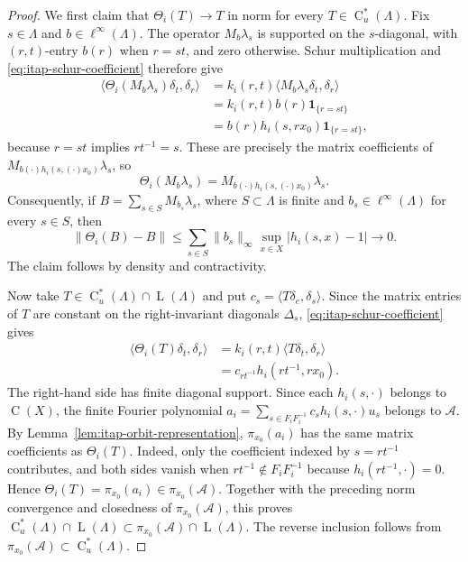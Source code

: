 \documentclass[11pt]{amsart}
\numberwithin{equation}{section}
\newcommand{\rL}{\operatorname{L}}
\newcommand{\rC}{\operatorname{C}}
\theoremstyle{definition}
\begin{document}
\begin{proof}
		We first claim that \(\Theta_i(T)\to T\) in norm for every \(T\in\rC_u^*(\Lambda)\). Fix \(s\in\Lambda\) and \(b\in\ell^\infty(\Lambda)\). The operator \(M_b\lambda_s\) is supported on the \(s\)-diagonal, with \((r,t)\)-entry \(b(r)\) when \(r=st\), and zero otherwise.
		Schur multiplication and \eqref{eq:itap-schur-coefficient} therefore give
		\begin{align*}
			\langle\Theta_i(M_b\lambda_s)\delta_t,\delta_r\rangle
			&=k_i(r,t)\langle M_b\lambda_s\delta_t,\delta_r\rangle\\
			&=k_i(r,t)b(r)\mathbf 1_{\{r=st\}}\\
			&=b(r)h_i(s,rx_0)\mathbf 1_{\{r=st\}},
		\end{align*}
		because \(r=st\) implies \(rt^{-1}=s\). These are precisely the matrix coefficients of \(M_{b(\mathord\cdot)h_i(s,(\mathord\cdot)x_0)}\lambda_s\),
		so
		\[
			\Theta_i(M_b\lambda_s)
			=M_{b(\mathord\cdot)h_i(s,(\mathord\cdot)x_0)}\lambda_s.
		\]
		Consequently, if \(B=\sum_{s\in S}M_{b_s}\lambda_s\), where \(S\subset\Lambda\) is finite and \(b_s\in\ell^\infty(\Lambda)\) for every \(s\in S\), then
		\[
		\|\Theta_i(B)-B\|
		\leq
		\sum_{s\in S}\|b_s\|_\infty
		\sup_{x\in X}|h_i(s,x)-1|
		\longrightarrow0.
		\]
		The claim follows by density and contractivity.
		
		Now take \(T\in\rC_u^*(\Lambda)\cap\rL(\Lambda)\) and put \(c_s=\langle T\delta_e,\delta_s\rangle\). Since the matrix entries of \(T\) are constant on the right-invariant diagonals \(\Delta_s\), \eqref{eq:itap-schur-coefficient} gives
		\begin{align*}
			\langle\Theta_i(T)\delta_t,\delta_r\rangle
			&=k_i(r,t)\langle T\delta_t,\delta_r\rangle\\
			&=c_{rt^{-1}}h_i(rt^{-1},rx_0).
		\end{align*}
		The right-hand side has finite diagonal support. Since each \(h_i(s,\mathord\cdot)\) belongs to \(\rC(X)\), the finite Fourier polynomial \(a_i=\sum_{s\in F_iF_i^{-1}}c_sh_i(s,\mathord\cdot)u_s\) belongs to \(\mathcal A\). By Lemma~\ref{lem:itap-orbit-representation}, \(\pi_{x_0}(a_i)\) has the same matrix coefficients as \(\Theta_i(T)\). Indeed, only the coefficient indexed by \(s=rt^{-1}\) contributes, and both sides vanish when \(rt^{-1}\notin F_iF_i^{-1}\) because \(h_i(rt^{-1},\mathord\cdot)=0\). Hence \(\Theta_i(T)=\pi_{x_0}(a_i)\in\pi_{x_0}(\mathcal A)\).
		Together with the preceding norm convergence and closedness of \(\pi_{x_0}(\mathcal A)\), this proves \(\rC_u^*(\Lambda)\cap\rL(\Lambda)\subset\pi_{x_0}(\mathcal A)\cap\rL(\Lambda)\).
		The reverse inclusion follows from \(\pi_{x_0}(\mathcal A)\subset\rC_u^*(\Lambda)\).
	\end{proof}
	
\end{document}
